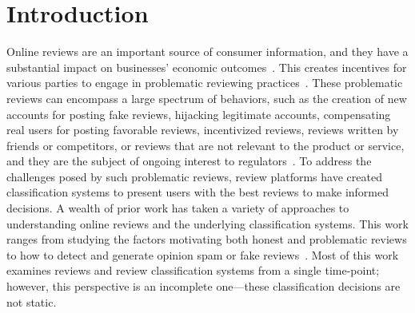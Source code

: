\section{Introduction} \label{sec:rim:introduction}




Online reviews are an important source of consumer information, and they have a substantial impact on businesses' economic outcomes~\cite{luca2016reviews,anderson2012impact}. This creates incentives for various parties to engage in problematic reviewing practices~\cite{streitfeld2012buy,miller19plastic}. These problematic reviews can encompass a large spectrum of behaviors, such as the creation of new accounts for posting fake reviews, hijacking legitimate accounts, compensating real users for posting favorable reviews, incentivized reviews, reviews written by friends or competitors, or reviews that are not relevant to the product or service, and they are the subject of ongoing interest to regulators~\cite{jindal2008opinion,yelpwhyrec,ftc21notice}. To address the challenges posed by such problematic reviews, review platforms have created classification systems to present users with the best reviews to make informed decisions. A wealth of prior work has taken a variety of approaches to understanding online reviews and the underlying classification systems. This work ranges from studying the factors motivating both honest and problematic reviews to how to detect and generate opinion spam or fake reviews~\cite{jindal2008opinion,yoo2008motivates,baginski2014exploring}. Most of this work examines reviews and review classification systems from a single time-point; however, this perspective is an incomplete one---these classification decisions are not static.


